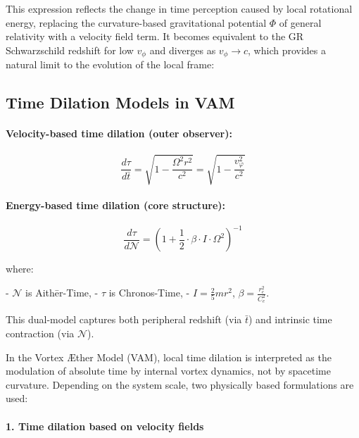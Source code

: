 This expression reflects the change in time perception caused by local rotational energy, replacing the curvature-based gravitational potential \( \Phi \) of general relativity with a velocity field term. It becomes equivalent to the GR Schwarzschild redshift for low \( v_\phi \) and diverges as \( v_\phi \rightarrow c \), which provides a natural limit to the evolution of the local frame:

\subsection*{Time Dilation Models in VAM}

\paragraph{Velocity-based time dilation (outer observer):}

\begin{equation}
    \frac{d\tau}{d\bar{t}} =
    \sqrt{1 - \frac{\Omega^2 r^2}{c^2}} = \sqrt{1 - \frac{v_\varphi^2}{c^2}}
\end{equation}

\paragraph{Energy-based time dilation (core structure):}

\begin{equation}
    \frac{d\tau}{d\mathcal{N}} =
    \left( 1 + \frac{1}{2} \cdot \beta \cdot I \cdot \Omega^2 \right)^{-1}
\end{equation}

\noindent where:

- \( \mathcal{N} \) is Aithēr-Time,
- \( \tau \) is Chronos-Time,
- \( I = \frac{2}{5} m r^2 \), \( \beta = \frac{r_c^2}{C_e^2} \).

This dual-model captures both peripheral redshift (via \( \bar{t} \)) and intrinsic time contraction (via \( \mathcal{N} \)).


In the Vortex Æther Model (VAM), local time dilation is interpreted as the modulation of absolute time by internal vortex dynamics, not by spacetime curvature. Depending on the system scale, two physically based formulations are used:

\paragraph{1. Time dilation based on velocity fields}

